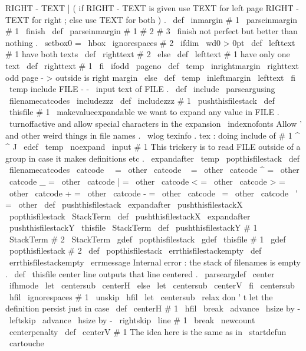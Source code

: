 {{RIGHT
-
TEXT
]
}
%
(
if
RIGHT
-
TEXT
is
given
use
TEXT
for
left
page
RIGHT
-
TEXT
for
right
;
%
else
use
TEXT
for
both
)
.
%
\
def
\
inmargin
#
1
{
\
parseinmargin
#
1
\
finish
}
\
def
\
parseinmargin
#
1
#
2
#
3
\
finish
{
%
not
perfect
but
better
than
nothing
.
\
setbox0
=
\
hbox
{
\
ignorespaces
#
2
}
%
\
ifdim
\
wd0
>
0pt
\
def
\
lefttext
{
#
1
}
%
have
both
texts
\
def
\
righttext
{
#
2
}
%
\
else
\
def
\
lefttext
{
#
1
}
%
have
only
one
text
\
def
\
righttext
{
#
1
}
%
\
fi
%
\
ifodd
\
pageno
\
def
\
temp
{
\
inrightmargin
\
righttext
}
%
odd
page
-
>
outside
is
right
margin
\
else
\
def
\
temp
{
\
inleftmargin
\
lefttext
}
%
\
fi
\
temp
}
%
include
FILE
-
-
\
input
text
of
FILE
.
%
\
def
\
include
{
\
parseargusing
\
filenamecatcodes
\
includezzz
}
\
def
\
includezzz
#
1
{
%
\
pushthisfilestack
\
def
\
thisfile
{
#
1
}
%
{
%
\
makevalueexpandable
%
we
want
to
expand
any
value
in
FILE
.
\
turnoffactive
%
and
allow
special
characters
in
the
expansion
\
indexnofonts
%
Allow
'
and
other
weird
things
in
file
names
.
\
wlog
{
texinfo
.
tex
:
doing
include
of
#
1
^
^
J
}
%
\
edef
\
temp
{
\
noexpand
\
input
#
1
}
%
%
%
This
trickery
is
to
read
FILE
outside
of
a
group
in
case
it
makes
%
definitions
etc
.
\
expandafter
}
\
temp
\
popthisfilestack
}
\
def
\
filenamecatcodes
{
%
\
catcode
\
\
=
\
other
\
catcode
~
=
\
other
\
catcode
^
=
\
other
\
catcode
_
=
\
other
\
catcode
|
=
\
other
\
catcode
<
=
\
other
\
catcode
>
=
\
other
\
catcode
+
=
\
other
\
catcode
-
=
\
other
\
catcode
\
=
\
other
\
catcode
\
'
=
\
other
}
\
def
\
pushthisfilestack
{
%
\
expandafter
\
pushthisfilestackX
\
popthisfilestack
\
StackTerm
}
\
def
\
pushthisfilestackX
{
%
\
expandafter
\
pushthisfilestackY
\
thisfile
\
StackTerm
}
\
def
\
pushthisfilestackY
#
1
\
StackTerm
#
2
\
StackTerm
{
%
\
gdef
\
popthisfilestack
{
\
gdef
\
thisfile
{
#
1
}
\
gdef
\
popthisfilestack
{
#
2
}
}
%
}
\
def
\
popthisfilestack
{
\
errthisfilestackempty
}
\
def
\
errthisfilestackempty
{
\
errmessage
{
Internal
error
:
the
stack
of
filenames
is
empty
.
}
}
%
\
def
\
thisfile
{
}
%
center
line
%
outputs
that
line
centered
.
%
\
parseargdef
\
center
{
%
\
ifhmode
\
let
\
centersub
\
centerH
\
else
\
let
\
centersub
\
centerV
\
fi
\
centersub
{
\
hfil
\
ignorespaces
#
1
\
unskip
\
hfil
}
%
\
let
\
centersub
\
relax
%
don
'
t
let
the
definition
persist
just
in
case
}
\
def
\
centerH
#
1
{
{
%
\
hfil
\
break
\
advance
\
hsize
by
-
\
leftskip
\
advance
\
hsize
by
-
\
rightskip
\
line
{
#
1
}
%
\
break
}
}
%
\
newcount
\
centerpenalty
\
def
\
centerV
#
1
{
%
%
The
idea
here
is
the
same
as
in
\
startdefun
\
cartouche
}}
